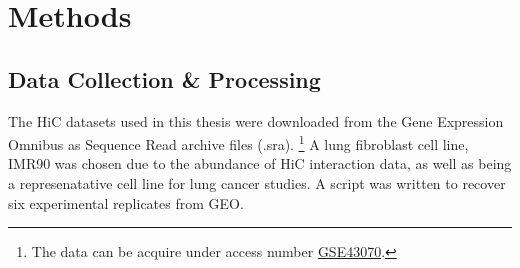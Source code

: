 \documentclass[phd,tocprelim]{cornell}
\begin{document}

\chapter{Methods}

\section{Data Collection \& Processing}

The HiC datasets used in this thesis were downloaded from the Gene
Expression Omnibus as Sequence Read archive files (.sra).
  \footnote{
    The data can be acquire under access number
    \href{http://www.ncbi.nlm.nih.gov/geo/query/acc.cgi?acc=GSE43070}
    {GSE43070}.\cite{Ren2013}
  }
A lung fibroblast cell line, IMR90 was chosen due to the abundance of
HiC interaction data, as well as being a represenatative cell line
for lung cancer studies.  A script was written to recover six experimental
replicates from GEO.
\end{document}
